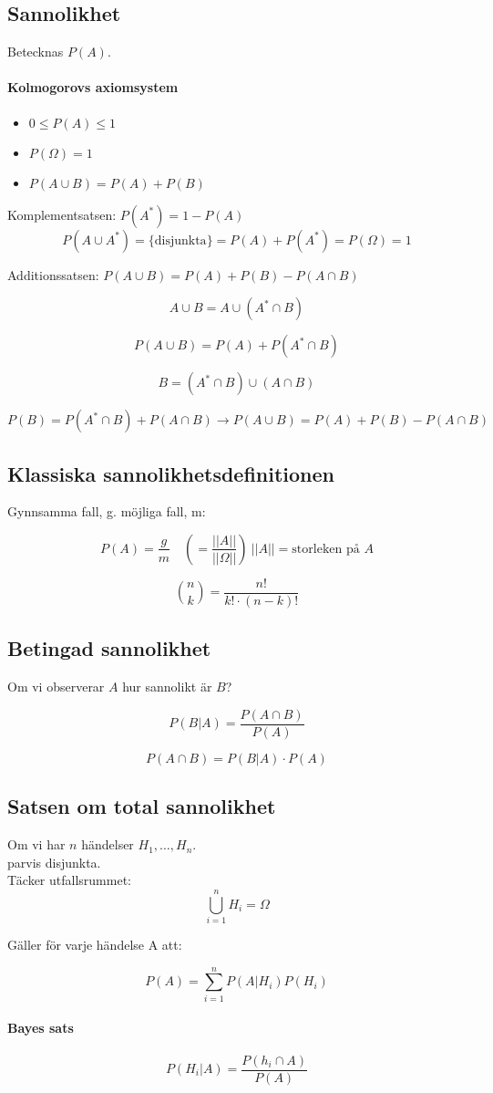 \documentclass[12pt]{article} %
\begin{document}
\subsection{Sannolikhet}
Betecknas $P(A)$.

\paragraph{Kolmogorovs axiomsystem}
\begin{itemize}
    \item $0 \leq P(A) \leq 1$
    \item $P(\Omega) = 1$
    \item $P(A \cup B) = P(A) + P(B)$
\end{itemize}

Komplementsatsen: $P(A^*) = 1 - P(A)$
\[
    P(A \cup A^*) = \{\text{disjunkta}\} = P(A) + P(A^*) = P(\Omega) = 1
\]

Additionssatsen:
$P(A \cup B) = P(A) + P(B) - P(A \cap B)$

\[
    A \cup B = A \cup (A^* \cap B)
\]

\[
    P(A \cup B) = P(A) + P(A^* \cap B)
\]

\[
    B = (A^* \cap B) \cup (A \cap B)
\]

\[
    P(B) = P(A^* \cap B) + P(A \cap B) \to P(A \cup B) = P(A) + P(B) - P(A \cap B)
\]

\subsection{Klassiska sannolikhetsdefinitionen}
Gynnsamma fall, g. möjliga fall, m:

\[
    P(A) = \frac{g}{m} \quad (= \frac{||A||}{||\Omega||}) \ ||A|| = \text{storleken på } A
\]

\[
    \binom{n}{k} = \frac{n!}{k! \cdot (n-k)!}
\]

\subsection{Betingad sannolikhet}
Om vi observerar $A$ hur sannolikt är $B$?

\[
    P(B | A) = \frac{P(A \cap B)}{P(A)}
\]

\[
    P(A \cap B) = P(B | A) \cdot P(A)
\]

\subsection{Satsen om total sannolikhet}
Om vi har $n$ händelser $H_1, \ldots, H_n$. \\
parvis disjunkta. \\
Täcker utfallsrummet: 
\[
    \bigcup_{i = 1}^{n} H_i = \Omega
\]

Gäller för varje händelse A att:

\[
    P(A) = \sum_{i = 1}^{n} P(A | H_i)P(H_i)
\]

\paragraph{Bayes sats}
\[
    P(H_i | A) = \frac{P(h_i \cap A)}{P(A)}
\]


\end{document}
